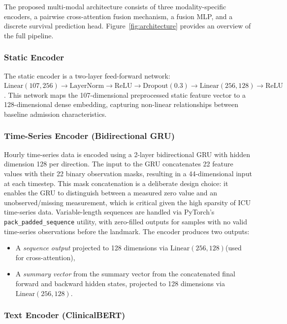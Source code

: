 \documentclass[10pt, a4paper]{article}
\begin{document}
The proposed multi-modal architecture consists of three modality-specific encoders, a pairwise cross-attention fusion mechanism, a fusion MLP, and a discrete survival prediction head. Figure~\ref{fig:architecture} provides an overview of the full pipeline.


\subsubsection{Static Encoder}

The static encoder is a two-layer feed-forward network: $\text{Linear}(107, 256) \to \text{LayerNorm} \to \text{ReLU} \to \text{Dropout}(0.3) \to \text{Linear}(256, 128) \to \text{ReLU}$. This network maps the 107-dimensional preprocessed static feature vector to a 128-dimensional dense embedding, capturing non-linear relationships between baseline admission characteristics.

\subsubsection{Time-Series Encoder (Bidirectional GRU)}

Hourly time-series data is encoded using a 2-layer bidirectional GRU with hidden dimension 128 per direction. The input to the GRU concatenates 22 feature values with their 22 binary observation masks, resulting in a 44-dimensional input at each timestep. This mask concatenation is a deliberate design choice: it enables the GRU to distinguish between a measured zero value and an unobserved/missing measurement, which is critical given the high sparsity of ICU time-series data. Variable-length sequences are handled via PyTorch's \texttt{pack\_padded\_sequence} utility, with zero-filled outputs for samples with no valid time-series observations before the landmark. The encoder produces two outputs:
\begin{itemize}[nosep]
    \item A \textit{sequence output} projected to 128 dimensions via $\text{Linear}(256, 128)$(used for cross-attention),
    \item A \textit{summary vector} from the summary vector from the concatenated final forward and backward hidden states, projected to 128 dimensions via $\text{Linear}(256, 128)$.
\end{itemize}

\subsubsection{Text Encoder (ClinicalBERT)}
\end{document}
